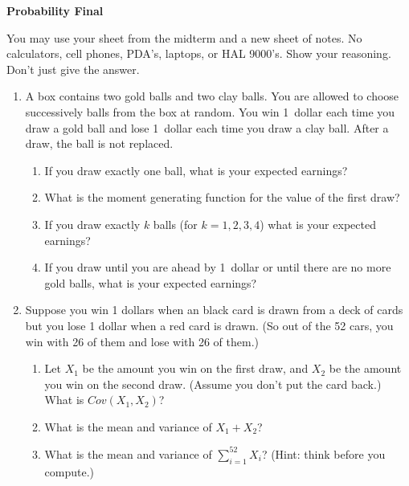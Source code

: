 \documentclass[letter,12pt]{extarticle}
\newcommand{\gap}{\vspace{1em}}
\newcommand{\answer}[1]{\noindent{\textcolor{mypurple}{\scriptsize{\{\bf answer:} \em #1\}}}}
\renewcommand{\answer}[1]{}
\begin{document}
\centerline{\bf Probability Final} 

You may use your sheet from the midterm and a new sheet of notes.  No
 calculators, cell phones, PDA's, laptops, or HAL 9000's.  Show your
 reasoning.  Don't just give the answer.

\gap
\begin{enumerate}

\item  A box contains two gold balls and two clay balls.  You
are allowed to choose successively balls from the box at random.  You win 1~dollar
each time you draw a gold ball and lose 1~dollar each time you draw a clay ball. 
After a draw, the ball is not replaced.  
\begin{enumerate}
\item If you draw exactly one ball, what is your expected
earnings?\answer{$2/4 - 2/4 = 0$.}
\item What is the moment generating function for the value of the
first draw?\answer{$(1/2)e^t + (1/2) e^{-t}$}
\item If you draw exactly $k$ balls (for $k = 1,2,3,4$) what is your
expected earnings? \answer{$0$}
\item If you draw until you are ahead by 1~dollar or until there are
 no more gold balls, what is your expected earnings?\answer{GGcc = 1,
GcGc = 1, GccG = 1, cGGc = 1, cGcG = 0, ccGG = 0.  Grand total is 4, each equally
likely, so 4/6, or 2/3.}
\end{enumerate}
\gap

\item Suppose you win 1 dollars when an black card is drawn from a deck of
cards but you lose 1 dollar when a red card is drawn.
(So out of the 52 cars, you win with 26 of them and lose with 26 of
them.)
\begin{enumerate}
\item Let $X_1$ be the amount you win on the first draw, and $X_2$ be the
amount you win on the second draw.  (Assume you don't put the card
back.) What is $Cov(X_1,X_2)$?

\answer{$(26/52)(25/51)-(26/52)(26/51)-(26/52)(26/51)+(26/52)(25/51)$
$ = (1/2)(1/52)(25-26-26+25)$
$ = (1/2)(1/51)(-2) = 1/51$ }

\item What is the mean and variance of $X_1 + X_2$?\answer{.25 - 2/51}
\item What is the mean and variance of $\sum_{i=1}^{52} X_i$? (Hint:
think before you compute.)\answer{0}
\end{enumerate}
\gap



\end{enumerate}
\end{document}

